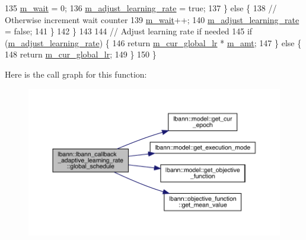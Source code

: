 \begin{DoxyCode}
135       \hyperlink{classlbann_1_1lbann__callback__adaptive__learning__rate_aecfb70e4a366762305a2dbd8248471de}{m\_wait} = 0;
136       \hyperlink{classlbann_1_1lbann__callback__adaptive__learning__rate_aa3de3b7d67b5295058e9c2175d06212d}{m\_adjust\_learning\_rate} = \textcolor{keyword}{true};
137     \} \textcolor{keywordflow}{else} \{
138       \textcolor{comment}{// Otherwise increment wait counter}
139       \hyperlink{classlbann_1_1lbann__callback__adaptive__learning__rate_aecfb70e4a366762305a2dbd8248471de}{m\_wait}++;
140       \hyperlink{classlbann_1_1lbann__callback__adaptive__learning__rate_aa3de3b7d67b5295058e9c2175d06212d}{m\_adjust\_learning\_rate} = \textcolor{keyword}{false};
141     \}
142   \}
143 
144   \textcolor{comment}{// Adjust learning rate if needed}
145   \textcolor{keywordflow}{if} (\hyperlink{classlbann_1_1lbann__callback__adaptive__learning__rate_aa3de3b7d67b5295058e9c2175d06212d}{m\_adjust\_learning\_rate}) \{
146     \textcolor{keywordflow}{return} \hyperlink{classlbann_1_1lbann__callback__learning__rate_a97194f282c29a748c915d9811a8a99fb}{m\_cur\_global\_lr} * \hyperlink{classlbann_1_1lbann__callback__adaptive__learning__rate_ab9c76371184664ccd8e240e3b16a9736}{m\_amt};
147   \} \textcolor{keywordflow}{else} \{
148     \textcolor{keywordflow}{return} \hyperlink{classlbann_1_1lbann__callback__learning__rate_a97194f282c29a748c915d9811a8a99fb}{m\_cur\_global\_lr};
149   \}
150 \}
\end{DoxyCode}
Here is the call graph for this function\+:\nopagebreak
\begin{figure}[H]
\begin{center}
\leavevmode
\includegraphics[width=350pt]{classlbann_1_1lbann__callback__adaptive__learning__rate_a6c64fae03736b8acba5c839f59d2ac6f_cgraph}
\end{center}
\end{figure}
\mbox{\label{classlbann_1_1lbann__callback__adaptive__learning__rate_ab7292639822b95f3907d1aaf88410b1c}} 
